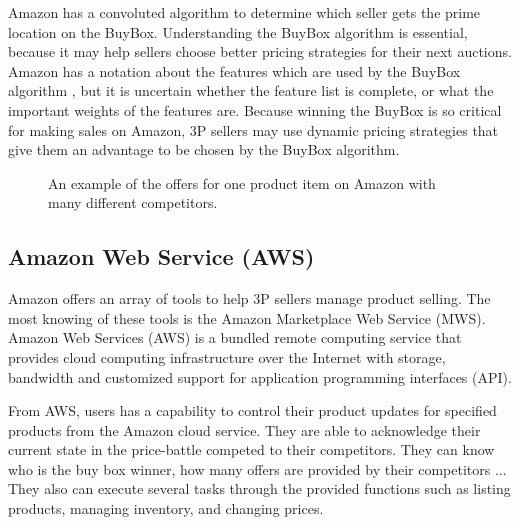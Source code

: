 {Amazon has a convoluted algorithm to determine which seller gets the prime location on the BuyBox. Understanding the BuyBox algorithm is essential, because it may help sellers choose better pricing strategies for their next auctions.  Amazon has a notation about the features which are used by the BuyBox algorithm \cite{amazon17}, but it is uncertain whether the feature list is complete, or what the important weights of the features are. Because winning the BuyBox is so critical for making sales on Amazon, 3P sellers may use dynamic pricing strategies that give them an advantage to be chosen by the BuyBox algorithm.

\begin{figure}[!h]
	\begin{center}
	\end{center}
	\caption{\label{fig:exampleoffer}An example of the offers for one product item on Amazon with many different competitors.}
\end{figure}


\subsection{Amazon Web Service (AWS)}
\label{sec:awsData}
 Amazon offers an array of tools to help 3P sellers manage product selling. The most knowing of these tools is the Amazon Marketplace Web Service (MWS). Amazon Web Services (AWS) is a bundled remote computing service that provides cloud computing infrastructure over the Internet with storage, bandwidth and customized support for application programming interfaces (API).

From AWS, users has a capability to control their product updates for specified products from the Amazon cloud service. They are able to acknowledge their current state in the price-battle competed to their competitors. They can know who is the buy box winner, how many offers are provided by their competitors ... They also can execute several tasks through the provided functions such as listing products, managing inventory, and changing prices. 

}
